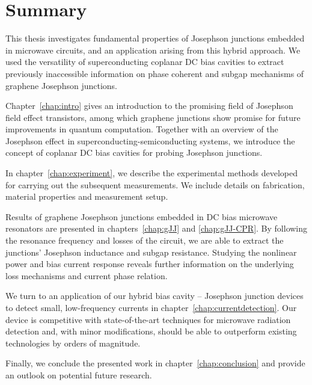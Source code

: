 \chapter*{Summary}

{%

This thesis investigates fundamental properties of Josephson junctions embedded in microwave circuits, and an application arising from this hybrid approach.
%
We used the versatility of superconducting coplanar DC bias cavities to extract previously inaccessible information on phase coherent and subgap mechanisms of graphene Josephson junctions.

\noindent \newline
Chapter~\ref{chap:intro} gives an introduction to the promising field of Josephson field effect transistors, among which graphene junctions show promise for future improvements in quantum computation.
%
Together with an overview of the Josephson effect in superconducting-semiconducting systems, we introduce the concept of coplanar DC bias cavities for probing Josephson junctions.

\noindent \newline
In chapter~\ref{chap:experiment}, we describe the experimental methods developed for carrying out the subsequent measurements.
%
We include details on fabrication, material properties and measurement setup.

\noindent \newline
Results of graphene Josephson junctions embedded in DC bias microwave resonators are presented in chapters~\ref{chap:gJJ} and \ref{chap:gJJ-CPR}.
%
By following the resonance frequency and losses of the circuit, we are able to extract the junctions' Josephson inductance and subgap resistance.
%
Studying the nonlinear power and bias current response reveals further information on the underlying loss mechanisms and current phase relation.

\noindent \newline
We turn to an application of our hybrid bias cavity -- Josephson junction devices to detect small, low-frequency currents in chapter~\ref{chap:currentdetection}.
%
Our device is competitive with state-of-the-art techniques for microwave radiation detection and, with minor modifications, should be able to outperform existing technologies by orders of magnitude.

\noindent \newline
Finally, we conclude the presented work in chapter~\ref{chap:conclusion} and provide an outlook on potential future research.

}
\afterpage{\pagecolor{none}}

